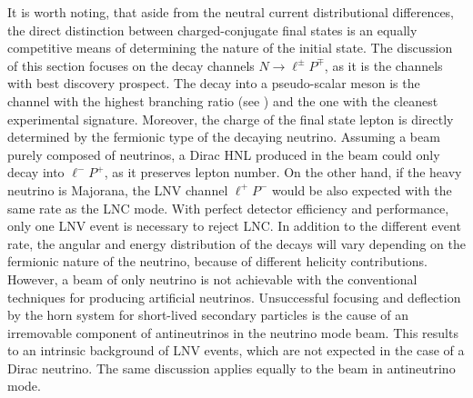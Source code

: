 It is worth noting, that aside from the neutral current distributional differences, %
the direct distinction between charged-conjugate final states is an equally competitive means of determining the nature of the initial state.
The discussion of this section focuses on the decay channels $N \to \ell^\pm P^\mp$, %
as it is the channels with best discovery prospect.
The decay into a pseudo-scalar meson is the channel with the highest branching ratio (see ) %
and the one with the cleanest experimental signature.
Moreover, the charge of the final state lepton is directly determined by the fermionic type of the decaying neutrino.
Assuming a beam purely composed of neutrinos, a Dirac HNL produced in the beam could only decay into $\ell^- P^+$, %
as it preserves lepton number.
On the other hand, if the heavy neutrino is Majorana, the LNV channel $\ell^+ P^-$ %
would be also expected with the same rate as the LNC mode.
With perfect detector efficiency and performance, only one LNV event is necessary to reject LNC.
In addition to the different event rate, the angular and energy distribution of the decays will vary %
depending on the fermionic nature of the neutrino, because of different helicity contributions.
However, a beam of only neutrino is not achievable with %
the conventional techniques for producing artificial neutrinos.
Unsuccessful focusing and deflection by the horn system for short-lived secondary particles is the cause %
of an irremovable component of antineutrinos in the neutrino mode beam. %
This results to an intrinsic background of LNV events, which are not expected in the case of a Dirac neutrino.
The same discussion applies equally to the beam in antineutrino mode.


